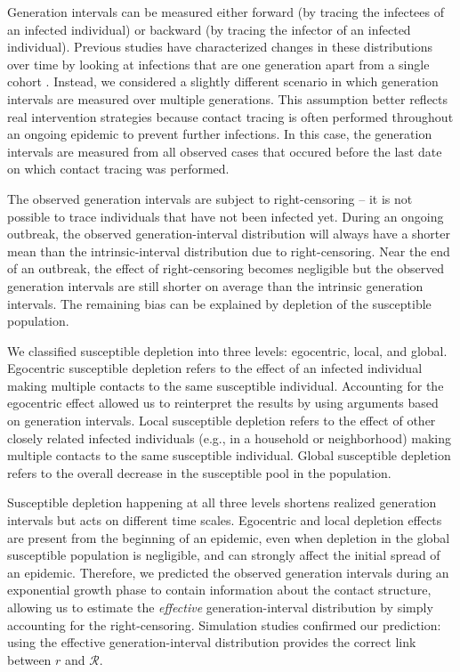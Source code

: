 \documentclass[12pt]{article}
\newcommand{\RR}{\ensuremath{{\mathcal R}}}
\begin{document}
Generation intervals can be measured either forward (by tracing the infectees of an infected individual) or backward (by tracing the infector of an infected individual).
Previous studies have characterized changes in these distributions over time by looking at infections that are one generation apart from a single cohort \citep{kenah2008generation, nishiura2010time, tomba2010some, champredon2015intrinsic, britton2019estimation}.
Instead, we considered a slightly different scenario in which generation intervals are measured over multiple generations.
This assumption better reflects real intervention strategies because contact tracing is often performed throughout an ongoing epidemic to prevent further infections. 
In this case, the generation intervals are measured from all observed cases that occured before the last date on which contact tracing was performed.

The observed generation intervals are subject to right-censoring -- it is not possible to trace individuals that have not been infected yet.
During an ongoing outbreak, the observed generation-interval distribution will always have a shorter mean than the intrinsic-interval distribution due to right-censoring.
Near the end of an outbreak, the effect of right-censoring becomes negligible but the observed generation intervals are still shorter on average than the intrinsic generation intervals.
The remaining bias can be explained by depletion of the susceptible population.

We classified susceptible depletion into three levels: egocentric, local, and global.
Egocentric susceptible depletion refers to the effect of an infected individual making multiple contacts to the same susceptible individual.
Accounting for the egocentric effect allowed us to reinterpret the results by \cite{trapman2016inferring} using arguments based on generation intervals.
Local susceptible depletion refers to the effect of other closely related infected individuals (e.g., in a household or neighborhood) making multiple contacts to the same susceptible individual.
Global susceptible depletion refers to the overall decrease in the susceptible pool in the population.

Susceptible depletion happening at all three levels shortens realized generation intervals but acts on different time scales.
Egocentric and local depletion effects are present from the beginning of an epidemic, even when depletion in the global susceptible population is negligible, and can strongly affect the initial spread of an epidemic.
Therefore, we predicted the observed generation intervals during an exponential growth phase to contain information about the contact structure, allowing us to estimate the \emph{effective} generation-interval distribution by simply accounting for the right-censoring.
Simulation studies confirmed our prediction: using the effective generation-interval distribution provides the correct link between $r$ and $\RR$.
\end{document}
